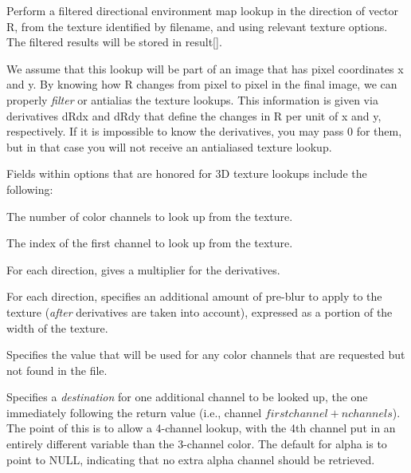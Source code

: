 Perform a filtered directional environment map lookup in the direction
of vector {\cf R}, from the texture identified by {\cf filename}, and
using relevant texture {\cf options}.  The filtered results will be
stored in {\cf result[]}.

We assume that this lookup will be part of an image that has pixel
coordinates {\cf x} and {\cf y}.  By knowing how {\cf R} changes from
pixel to pixel in the final image, we can properly \emph{filter} or
antialias the texture lookups.  This information is given via
derivatives {\cf dRdx} and {\cf dRdy} that define the changes in {\cf R}
per unit of {\cf x} and {\cf y}, respectively.  If it is impossible to
know the derivatives, you may pass 0 for them, but in that case you will
not receive an antialiased texture lookup.

Fields within {\cf options} that are honored for 3D texture lookups
include the following:

\vspace{-12pt}
\vspace{10pt}
The number of color channels to look up from the texture.
\apiend

\vspace{-24pt}
\vspace{10pt}
The index of the first channel to look up from the texture.
\apiend

\vspace{-24pt}
\vspace{10pt}
For each direction, gives a multiplier for the derivatives.
\apiend

\vspace{-24pt}
\vspace{10pt}
For each direction, specifies an additional amount of pre-blur to apply
to the texture (\emph{after} derivatives are taken into account),
expressed as a portion of the width of the texture.
\apiend

\vspace{-24pt}
\vspace{10pt}
Specifies the value that will be used for any color channels that are
requested but not found in the file.
\apiend

\vspace{-24pt}
\vspace{10pt}
Specifies a \emph{destination} for one additional channel to be looked
up, the one immediately following the return value (i.e., channel
$\mathit{firstchannel}+\mathit{nchannels}$).  The point of this is to
allow a 4-channel lookup, with the 4th channel put in an entirely
different variable than the 3-channel color.  The default for {\cf
  alpha} is to point to NULL, indicating that no extra alpha channel
should be retrieved.
\apiend

